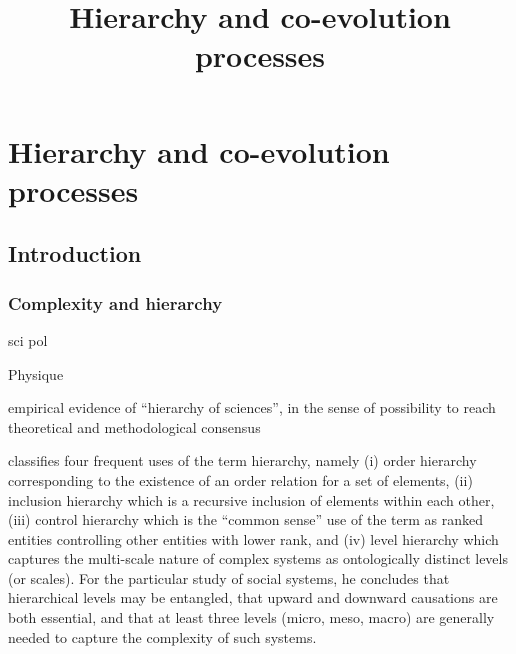 \documentclass[english,fleqn,allpages]{ISTE_science}[2018/07/30]
\title{Hierarchy and co-evolution processes}
\begin{document}
\raggedbottom



\mainmatter
\chapter{Hierarchy and co-evolution processes}%
\label{chap-struct}






\cite{pumain:halshs-02303136}

\section{Introduction}



\subsection{Complexity and hierarchy}

sci pol \cite{crumley1987dialectical}

Physique \cite{10.1371/journal.pone.0033799}



\cite{fanelli2013bibliometric} empirical evidence of ``hierarchy of sciences'', in the sense of possibility to reach theoretical and methodological consensus %

\cite{lane2006hierarchy} classifies four frequent uses of the term hierarchy, namely (i) order hierarchy corresponding to the existence of an order relation for a set of elements, (ii) inclusion hierarchy which is a recursive inclusion of elements within each other, (iii) control hierarchy which is the ``common sense'' use of the term as ranked entities controlling other entities with lower rank, and (iv) level hierarchy which captures the multi-scale nature of complex systems as ontologically distinct levels (or scales). For the particular study of social systems, he concludes that hierarchical levels may be entangled, that upward and downward causations are both essential, and that at least three levels (micro, meso, macro) are generally needed to capture the complexity of such systems.
\end{document}

